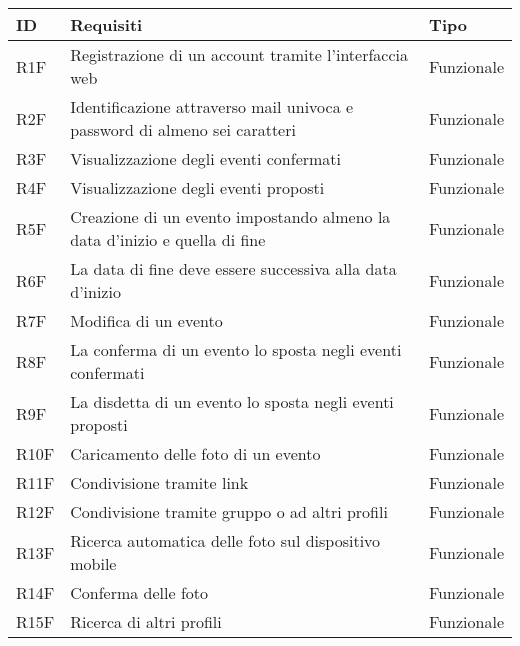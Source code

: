\begin{longtable} {|P{1.3cm}|P{11.2cm}|P{3cm}|}
    \hline
    \textbf{ID} & \textbf{Requisiti}                                                         & \textbf{Tipo}  \\
    \hline
    \endhead
    R1F         & Registrazione di un account tramite l’interfaccia web                      & Funzionale     \\
    \hline
    R2F         & Identificazione attraverso mail univoca e password di almeno sei caratteri & Funzionale     \\
    \hline
    R3F         & Visualizzazione degli eventi confermati                                    & Funzionale     \\
    \hline
    R4F         & Visualizzazione degli eventi proposti                                      & Funzionale     \\
    \hline
    R5F         & Creazione di un evento impostando almeno la data d'inizio e quella di fine & Funzionale     \\
    \hline
    R6F         & La data di fine deve essere successiva alla data d'inizio                  & Funzionale     \\
    \hline
    R7F         & Modifica di un evento                                                      & Funzionale     \\
    \hline
    R8F         & La conferma di un evento lo sposta negli eventi confermati                 & Funzionale     \\
    \hline
    R9F         & La disdetta di un evento lo sposta negli eventi proposti                   & Funzionale     \\
    \hline
    R10F        & Caricamento delle foto di un evento                                        & Funzionale     \\
    \hline
    R11F        & Condivisione tramite link                                                  & Funzionale     \\
    \hline
    R12F        & Condivisione tramite gruppo o ad altri profili                             & Funzionale     \\
    \hline
    R13F        & Ricerca automatica delle foto sul dispositivo mobile                       & Funzionale     \\
    \hline
    R14F        & Conferma delle foto                                                        & Funzionale     \\
    \hline
    R15F        & Ricerca di altri profili                                                   & Funzionale     \\

\end{longtable}
